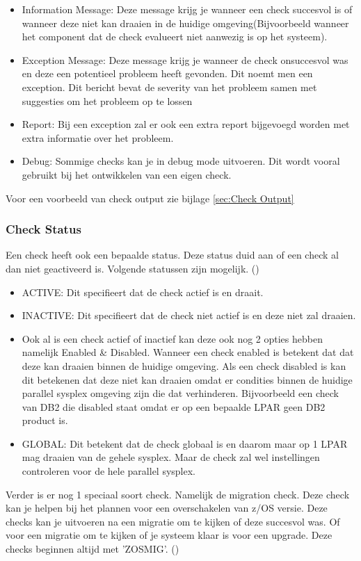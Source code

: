 \begin{itemize}
	\item Information Message: Deze message krijg je wanneer een check succesvol is of wanneer deze niet kan draaien in de huidige omgeving(Bijvoorbeeld wanneer het component dat de check evalueert niet aanwezig is op het systeem).
	\item Exception Message: Deze message krijg je wanneer de check onsuccesvol was en deze een potentieel probleem heeft gevonden. Dit noemt men een exception. Dit bericht bevat de severity van het probleem samen met suggesties om het probleem op te lossen
	\item Report: Bij een exception zal er ook een extra report bijgevoegd worden met extra informatie over het probleem.
	\item Debug: Sommige checks kan je in debug mode uitvoeren. Dit wordt vooral gebruikt bij het ontwikkelen van een eigen check.
\end{itemize}

Voor een voorbeeld van check output zie bijlage \ref{sec:Check Output}

\subsubsection{Check Status}
\label{subsubsec:Check Status}

Een check heeft ook een bepaalde status. Deze status duid aan of een check al dan niet geactiveerd is. Volgende statussen zijn mogelijk. (\cite{IBM2019})

\begin{itemize}
	\item ACTIVE: Dit specifieert dat de check actief is en draait.
	\item INACTIVE: Dit specifieert dat de check niet actief is en deze niet zal draaien.
	\item Ook al is een check actief of inactief kan deze ook nog 2 opties hebben namelijk Enabled \& Disabled. Wanneer een check enabled is betekent dat dat deze kan draaien binnen de huidige omgeving. Als een check disabled is kan dit betekenen dat deze niet kan draaien omdat er condities binnen de huidige parallel sysplex omgeving zijn die dat verhinderen. Bijvoorbeeld een check van DB2 die disabled staat omdat er op een bepaalde LPAR geen DB2 product is.
	\item GLOBAL: Dit betekent dat de check globaal is en daarom maar op 1 LPAR mag draaien van de gehele sysplex. Maar de check zal wel instellingen controleren voor de hele parallel sysplex. 
\end{itemize}


Verder is er nog 1 speciaal soort check. Namelijk de migration check. Deze check kan je helpen bij het plannen voor een overschakelen van z/OS versie. Deze checks kan je uitvoeren na een migratie om te kijken of deze succesvol was. Of voor een migratie om te kijken of je systeem klaar is voor een upgrade. Deze checks beginnen altijd met 'ZOSMIG'. (\cite{IBMCorporation2019})
